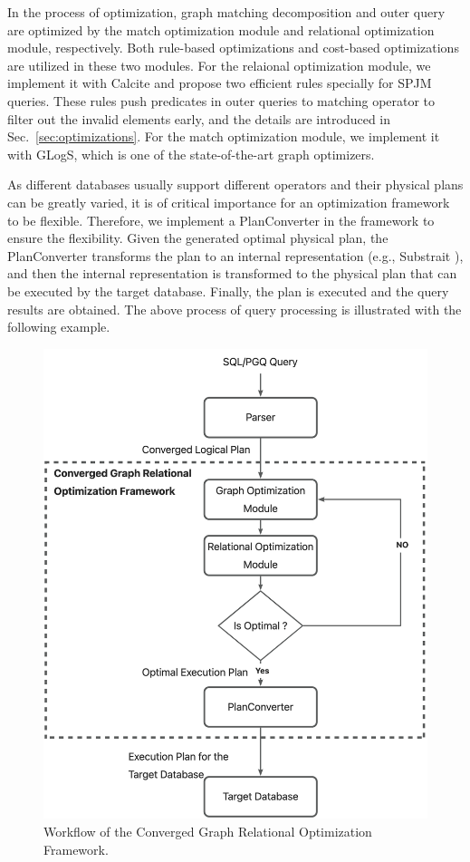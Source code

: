 In the process of optimization, graph matching decomposition and outer query are optimized by the match optimization module and relational optimization module, respectively.
Both rule-based optimizations and cost-based optimizations are utilized in these two modules.
For the relaional optimization module, we implement it with Calcite and propose two efficient rules specially for SPJM queries.
These rules push predicates in outer queries to matching operator to filter out the invalid elements early, and the details are introduced in Sec.~\ref{sec:optimizations}.
For the match optimization module, we implement it with GLogS, which is one of the state-of-the-art graph optimizers.

As different databases usually support different operators and their physical plans can be greatly varied, it is of critical importance for an optimization framework to be flexible.
Therefore, we implement a PlanConverter in the framework to ensure the flexibility.
Given the generated optimal physical plan, the PlanConverter transforms the plan to an internal representation (e.g., Substrait \cite{substrait}), and then the internal representation is transformed to the physical plan that can be executed by the target database.
Finally, the plan is executed and the query results are obtained.
The above process of query processing is illustrated with the following example.


\begin{figure}
    \centering
    \includegraphics[width=.8\linewidth]{./figures/workflow.png}
    \caption{Workflow of the Converged Graph Relational Optimization Framework.}
    \label{fig:workflow}
\end{figure}

